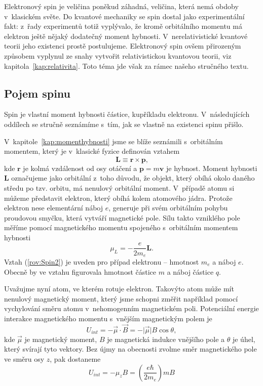 Elektronový spin je veličina poněkud záhadná, veličina, která nemá obdoby v~klasickém světe. Do kvantové mechaniky se spin dostal jako experimentální fakt: z~řady experimentů totiž vyplývalo, že kromě orbitálního momentu má elektron ještě nějaký dodatečný moment hybnosti. V~nerelativistické kvantové teorii jeho existenci prostě postulujeme. Elektronový spin ovšem přirozeným způsobem vyplynul ze snahy vytvořit relativistickou kvantovou teorii, viz kapitola~\ref{kap:relativita}. Toto téma jde však za rámec našeho stručného textu.

\subsection{Pojem spinu}
\label{kap:PojemSpinu}

Spin je vlastní moment hybnosti částice, kupříkladu elektronu. V~následujících oddílech se stručně seznámíme s~tím, jak se vlastně na existenci spinu přišlo.

V~kapitole~\ref{kap:momenthybnosti} jsme se blíže seznámili s~orbitálním momentem, který je v~klasické fyzice definován vztahem
\begin{equation}
\mathbf{L} \equiv \mathbf{r} \times \mathbf{p} \mbox{,}
\label{rov:Spin1}
\end{equation}
kde $\mathbf{r}$ je kolmá vzdálenost od osy otáčení a $\mathbf{p} = m \mathbf{v}$ je hybnost. Moment hybnosti $\mathbf{L}$ označujeme jako orbitální z~toho důvodu, že objekt, který obíhá okolo daného středu po tzv. orbitu, má nenulový orbitální moment. V~případě atomu si můžeme představit elektron, který obíhá kolem atomového jádra. Protože elektron nese elementární náboj $e$, generuje při svém orbitálním pohybu proudovou smyčku, která vytváří magnetické pole. Sílu takto vzniklého pole měříme pomocí magnetického momentu spojeného s~orbitálním momentem hybnosti
\begin{equation}
\mu_L = -\frac{e}{2m_e}\mathbf{L} \mbox{.}
\label{rov:Spin2}
\end{equation}
Vztah (\ref{rov:Spin2}) je uveden pro případ elektronu -- hmotnost $m_e$ a náboj $e$. Obecně by ve vztahu figurovala hmotnost částice $m$ a náboj částice $q$. 

Uvažujme nyní atom, ve kterém rotuje elektron. Takovýto atom může mít nenulový magnetický moment, který jsme schopni změřit například pomocí vychylování směru atomu v~nehomogenním magnetickém poli. Potenciální energie interakce magnetického momentu s~vnějším magnetickým polem je
\begin{equation}
U_{int} = - \vec{\mu} \cdot \vec{B} = - \vert \vec{\mu} \vert B \cos \theta,
\nonumber
\end{equation}
kde $\vec{\mu}$ je magnetický moment, $B$ je magnetická indukce vnějšího pole a $\theta$ je úhel, který svírají tyto vektory. Bez újmy na obecnosti zvolme směr magnetického pole ve směru osy $z$, pak dostaneme
\begin{equation}
U_{int} = - \mu_z B = \left( \frac{e \hbar}{2 m_e} \right) m B
\label{rov:Spin26}
\end{equation}

